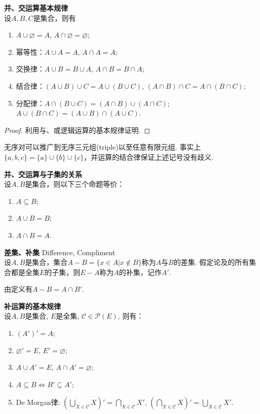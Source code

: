 \begin{pro}\textbf{并、交运算基本规律}\\
设$A,B,C$是集合，则有
\begin{enumerate}
    \item $A \cup \varnothing = A$, $A \cap \varnothing = \varnothing$;
    \item 幂等性：$A\cup A=A$, $A\cap A=A$;
    \item 交换律：$A\cup B=B\cup A$, $A\cap B=B\cap A$;
    \item 结合律：$(A\cup B)\cup C=A\cup (B\cup C)$, $(A\cap B)\cap C=A\cap (B\cap C)$;
    \item 分配律：$A\cap(B\cup C)=(A\cap B)\cup (A\cap C)$; $A\cup(B\cap C)=(A\cup B)\cap (A\cup C)$.
\end{enumerate}
\end{pro}
\begin{proof}
    利用与、或逻辑运算的基本规律证明.
\end{proof}
无序对可以推广到无序三元组(triple)以至任意有限元组. 事实上$\{a,b,c\} = \{a\} \cup \{b\} \cup \{c\}$，并运算的结合律保证上述记号没有歧义. 

\begin{pro} \textbf{并、交运算与子集的关系}\\
设$A,B$是集合，则以下三个命题等价：
\begin{enumerate}
    \item $A\subseteq B$;
    \item $A\cup B=B$;
    \item $A\cap B=A$.
\end{enumerate}
\end{pro}

\begin{dfn} \textbf{差集、补集} Difference, Compliment \\
设$A,B$是集合，集合$A-B=\{x\in A\vert x\notin B\}$称为$A$与$B$的差集. 假定论及的所有集合都是全集$E$的子集，则$E-A$称为$A$的补集，记作$A'$.
\end{dfn}
由定义有$A-B=A\cap B'$.

\begin{pro} \textbf{补运算的基本规律}\\
设$A,B$是集合, $E$是全集, $\mathcal{C}\in \mathcal{P}(E)$, 则有：
\begin{enumerate}
    \item $(A')'=A$;
    \item $\varnothing'=E$, $E'=\varnothing$;
    \item $A\cup A'=E$, $A\cap A'=\varnothing$;

    \item $A\subseteq B\Leftrightarrow B' \subseteq A'$;
    \item De Morgan律: $(\bigcup_{X\in \mathcal{C}}X)'=\bigcap_{X\in \mathcal{C}}X'$, $(\bigcap_{X\in \mathcal{C}}X)'=\bigcup_{X\in \mathcal{C}}X'$.
\end{enumerate}
\end{pro}

